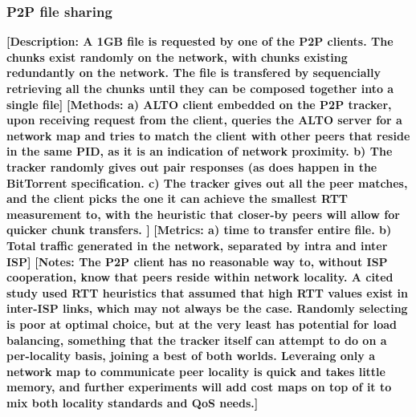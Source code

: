 \subsubsection{P2P file sharing}
\textbf{[Description: A 1GB file is requested by one of the P2P clients. The chunks exist randomly on the network, with chunks existing redundantly on the network. The file is transfered by sequencially retrieving all the chunks until they can be composed together into a single file]}
\textbf{[Methods: a) ALTO client embedded on the P2P tracker, upon receiving request from the client, queries the ALTO server for a network map and tries to match the client with other peers that reside in the same PID, as it is an indication of network proximity. b) The tracker randomly gives out pair responses (as does happen in the BitTorrent specification. c) The tracker gives out all the peer matches, and the client picks the one it can achieve the smallest RTT measurement to, with the heuristic that closer-by peers will allow for quicker chunk transfers. ]}
\textbf{[Metrics: a) time to transfer entire file. b) Total traffic generated in the network, separated by intra and inter ISP]}
\textbf{[Notes: The P2P client has no reasonable way to, without ISP cooperation, know that peers reside within network locality. A cited study used RTT heuristics that assumed that high RTT values exist in inter-ISP links, which may not always be the case. Randomly selecting is poor at optimal choice, but at the very least has potential for load balancing, something that the tracker itself can attempt to do on a per-locality basis, joining a best of both worlds. Leveraing only a network map to communicate peer locality is quick and takes little memory, and further experiments will add cost maps on top of it to mix both locality standards and QoS needs.]}


